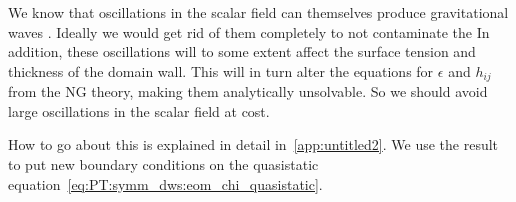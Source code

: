 
    We know that oscillations in the scalar field can themselves produce gravitational waves  \citep{kawasakiStudyGravitationalRadiation2011}. Ideally we would get rid of them completely to not contaminate the  In addition, these oscillations will to some extent affect the surface tension and thickness of the domain wall. This will in turn alter the equations for $\epsilon$ and $h_{ij}$ from the NG theory, making them analytically unsolvable. So we should avoid large oscillations in the scalar field at  cost.
    


    

    How to go about this is explained in detail in~\cref{app:untitled2}. We use the result to put new boundary conditions on the quasistatic equation~\cref{eq:PT:symm_dws:eom_chi_quasistatic}.



    
    








